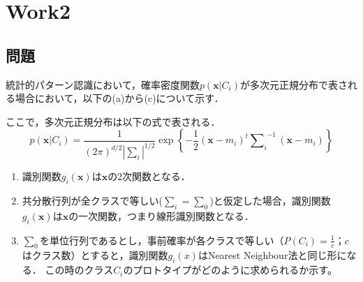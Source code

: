 \section{Work2}
\subsection*{問題}
統計的パターン認識において，確率密度関数$p(\bm{x}|C_i)$が多次元正規分布で表される場合において，以下の(a)から(c)について示す．\par
ここで，多次元正規分布は以下の式で表される．
\begin{equation*}
    p(\bm{x}|C_i)=\frac{1}{(2\pi)^{d/2}\left|\bm{\sum}_i\right|^{1/2}}\exp\left\{-\frac{1}{2}(\bm{x}-m_i)^t{{\bm{\sum}}_i}^{-1}(\bm{x}-m_i)\right\}
\end{equation*}
\begin{enumerate}
    \renewcommand{\labelenumi}{(\alph{enumi})}
    \item 識別関数$g_i(\bm{x})$は$\bm{x}$の2次関数となる．
    \item 共分散行列が全クラスで等しい($\sum_i=\sum_0$)と仮定した場合，識別関数$g_i(\bm{x})$は$\bm{x}$の一次関数，つまり線形識別関数となる．
    \item $\sum_0$を単位行列であるとし，事前確率が各クラスで等しい（$P(C_i)=\frac{1}{c}$；$c$はクラス数）とすると，識別関数$g_i(x)$はNearest Neighbour法と同じ形になる．
    この時のクラス$C_i$のプロトタイプがどのように求められるか示す。
\end{enumerate}

